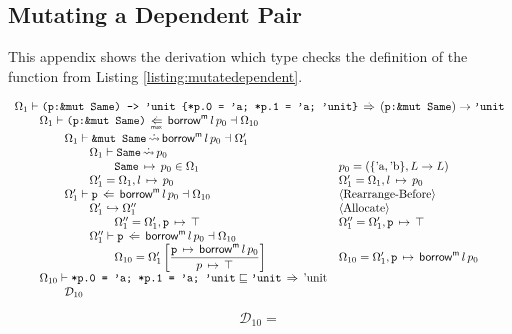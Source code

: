 \documentclass[12pt,twoside]{report}
\begin{document}
\subsection{Mutating a Dependent Pair}
\label{appendix:mutateddependentderivation}
This appendix shows the derivation which type checks the definition of the  function from Listing \ref{listing:mutatedependent}.

{
  \smaller
  \[\begin{array}{ll}
    \multicolumn{2}{l}{ 
      $$\Omega_1 \vdash \mono{(p:\&mut Same) -> 'unit \{*p.0 = 'a; *p.1 = 'a; 'unit\}} \movearrowabs (\mono{p:\&mut Same}) \rightarrow \mono{'unit}$$
    } \\
  
    \otab\Omega_1 \vdash \mono{(p:\&mut Same)} \maxarrow{\writearrowabs} \borrowm{l}{p_0} \dashv \Omega_{10} \\
    \otab\otab \Omega_1 \vdash \mono{\&mut Same} \erasedreadarrow \borrowm{l}{p_0} \dashv \Omega_1' \\
    \otab\otab\otab \Omega_1 \vdash \mono{Same} \erasedreadarrow p_0 \\
    \otab\otab\otab\otab \absmapm{Same}{p_0} \in \Omega_1 &
      p_0 = (\{\atom{a}, \atom{b}\}, L \rightarrow L) \\
    \otab\otab\otab \Omega_1' = \Omega_1, \absmap{l}{p_0} &
      \Omega_1' = \Omega_1, \absmap{l}{p_0} \\
    \otab\otab \Omega_1' \vdash \mono{p} \writearrowabs \borrowm{l}{p_0} \dashv \Omega_{10} &
      \langle\text{Rearrange-Before}\rangle \\
    \otab\otab\otab \Omega_1' \rearrangearrow \Omega_1'' &
      \langle\text{Allocate}\rangle \\
    \otab\otab\otab\otab \Omega_1'' = \Omega_1', \absmapm{p}{\top} &
      \Omega_1'' = \Omega_1', \absmapm{p}{\top} \\
    \otab\otab\otab \Omega_1'' \vdash \mono{p} \writearrowabs \borrowm{l}{p_0} \dashv \Omega_{10} \\
    \otab\otab\otab\otab \Omega_{10} = \Omega_1'\left[\dfrac{\absmapm{p}{\borrowm{l}{p_0}}}{\absmap{p}{\top}}\right] &
      \Omega_{10} = \Omega_1', \absmapm{p}{\borrowm{l}{p_0}} \\
    
    \otab \Omega_{10} \vdash \mono{*p.0 = 'a; *p.1 = 'a; 'unit} \subtype \mono{'unit} \movearrowabs \atom{unit} \\
    \otab\otab \mathcal{D}_{10}
  \end{array}\]
  \[\begin{array}{ll}
    \mathcal{D}_{10} = \\\\


\end{array}\]}
\end{document}
